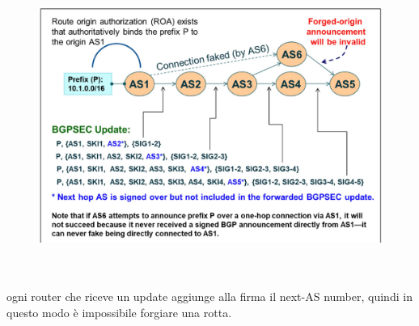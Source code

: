 \documentclass[12pt, oneside]{extbook} %
\begin{document}
\begin{figure}[h!]
    \centering
    \includegraphics[scale=0.5]{../../immagini/bgp_path_valid}
\end{figure}\\\\
ogni router che riceve un update aggiunge alla firma il next-AS number, quindi in questo modo è impossibile forgiare una rotta.
\end{document}
